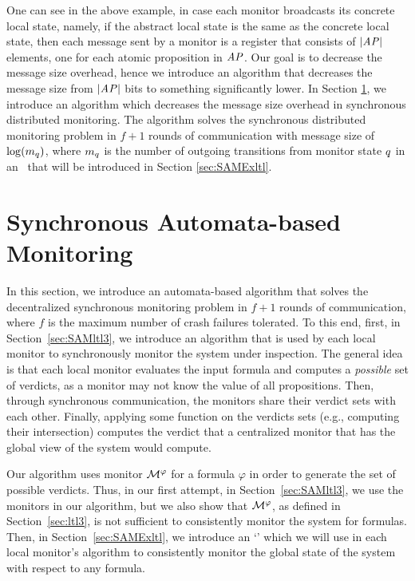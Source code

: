 
One can see in the above example, in case each monitor broadcasts its concrete 
local state, namely, if the abstract local state is the same as the concrete 
local state, then each message sent by a monitor is a register that consists of 
$|\mathit{AP}|$ elements, one for each atomic proposition in $\mathit{AP}$. Our goal is to 
decrease the message size overhead, hence we introduce an algorithm that 
decreases the message size from $|\mathit{AP}|$ bits to something 
significantly lower. In Section \ref{sec:SAM}, we introduce an algorithm which 
decreases the message size overhead in synchronous distributed monitoring. The 
algorithm solves the synchronous distributed monitoring problem in $f +1$ 
rounds of communication with message size of $\log(m_q)$, where $m_q$ is the number of outgoing transitions from monitor state $q$ in an \Exltl~that will be introduced in Section \ref{sec:SAMExltl}.


\section{Synchronous Automata-based Monitoring}
\label{sec:SAM}

In this section, we introduce an automata-based algorithm that solves the 
decentralized synchronous monitoring problem in $f+1$ rounds of communication, 
where $f$ is the maximum number of crash failures tolerated. To this end, 
first, in Section~\ref{sec:SAMltl3}, we introduce an algorithm that is used by 
each local monitor to synchronously monitor the system under inspection. The 
general idea is that each local monitor evaluates the input formula and 
computes a {\em possible} set of verdicts, as a monitor may not know the 
value of all propositions. Then, through synchronous communication, the 
monitors share their verdict sets with each other. Finally, applying some 
function on the verdicts sets (e.g., computing their intersection) computes 
the verdict that a centralized monitor that has the global view of the system 
would compute.

Our algorithm uses \LTLtri monitor $\mathcal{M}^\varphi$ for a formula $\varphi$ in 
order to generate the set of possible verdicts. Thus, in our first attempt, in 
Section~\ref{sec:SAMltl3}, we use the \LTLtri monitors in our algorithm, but we 
also show that $\mathcal{M}^\varphi$, as defined in Section~\ref{sec:ltl3}, is 
not sufficient to consistently monitor the system for \LTL formulas. Then, 
in Section~\ref{sec:SAMExltl}, we introduce an `\Exltl' which we will use in 
each local monitor's algorithm to consistently monitor the global state of the 
system with respect to any \LTL formula. 



